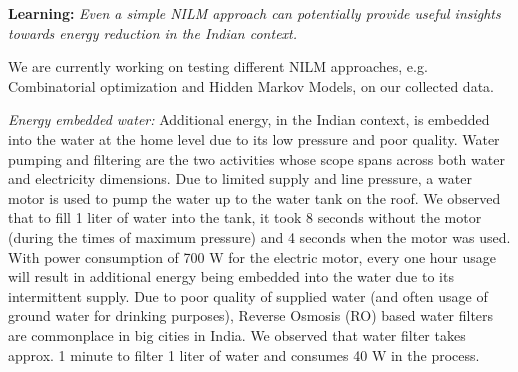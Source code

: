 \documentclass[10pt]{sensys-proc}
\newcommand{\redcolor}[1]{\textcolor{red}{#1}}
\begin{document}
\textbf{Learning:} \emph{Even a simple NILM approach can potentially provide useful insights towards energy reduction in the Indian context.}

We are currently working on testing different NILM approaches, e.g. Combinatorial optimization and Hidden Markov Models, on our collected data.

\emph{Energy embedded water:} Additional energy, in the Indian context, is embedded into the water at the home level due to its low pressure and poor quality. Water pumping and filtering are the two activities whose scope spans across both water and electricity dimensions. Due to limited supply and line pressure, a water motor is used to pump the water up to the water tank on the roof. We observed that to fill 1 liter of water into the tank, it took 8 seconds without the motor (during the times of maximum pressure) and 4 seconds when the motor was used. With power consumption of 700 W for the electric motor, every one hour usage will result in additional energy being embedded into the water due to its intermittent supply. %
Due to poor quality of supplied water (and often usage of ground water for drinking purposes), Reverse Osmosis (RO) based water filters are commonplace in big cities in India. We observed that water filter takes approx. 1 minute to filter 1 liter of water and consumes 40 W in the process. 
\end{document}
